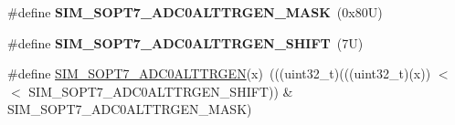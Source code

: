 \begin{DoxyCompactItemize}
\#define {\bfseries S\+I\+M\+\_\+\+S\+O\+P\+T7\+\_\+\+A\+D\+C0\+A\+L\+T\+T\+R\+G\+E\+N\+\_\+\+M\+A\+SK}~(0x80\+U)
\item 
\mbox{\label{group___s_i_m___register___masks_gaa20ed5f5ab9cf02714a993c3996adcc5}} 
\#define {\bfseries S\+I\+M\+\_\+\+S\+O\+P\+T7\+\_\+\+A\+D\+C0\+A\+L\+T\+T\+R\+G\+E\+N\+\_\+\+S\+H\+I\+FT}~(7\+U)
\item 
\#define \mbox{\hyperlink{group___s_i_m___register___masks_gaa6e4ac1e062d8dbe841774255a1c04e9}{S\+I\+M\+\_\+\+S\+O\+P\+T7\+\_\+\+A\+D\+C0\+A\+L\+T\+T\+R\+G\+EN}}(x)~(((uint32\+\_\+t)(((uint32\+\_\+t)(x)) $<$$<$ S\+I\+M\+\_\+\+S\+O\+P\+T7\+\_\+\+A\+D\+C0\+A\+L\+T\+T\+R\+G\+E\+N\+\_\+\+S\+H\+I\+FT)) \& S\+I\+M\+\_\+\+S\+O\+P\+T7\+\_\+\+A\+D\+C0\+A\+L\+T\+T\+R\+G\+E\+N\+\_\+\+M\+A\+SK)
\end{DoxyCompactItemize}
